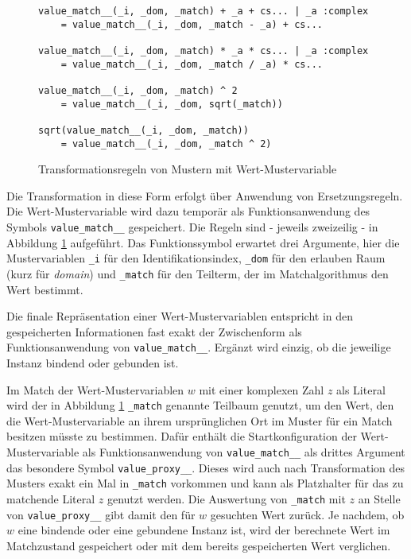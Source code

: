 \begin{figure}
\begin{verbatim}
value_match__(_i, _dom, _match) + _a + cs... | _a :complex 
    = value_match__(_i, _dom, _match - _a) + cs...
        
value_match__(_i, _dom, _match) * _a * cs... | _a :complex 
    = value_match__(_i, _dom, _match / _a) * cs...
        
value_match__(_i, _dom, _match) ^ 2                        
    = value_match__(_i, _dom, sqrt(_match))
        
sqrt(value_match__(_i, _dom, _match))                           
    = value_match__(_i, _dom, _match ^ 2)
\end{verbatim}
\label{figWertMusterBau}
\caption{Transformationsregeln von Mustern mit Wert-Mustervariable}
\end{figure}

Die Transformation in diese Form erfolgt über Anwendung von Ersetzungsregeln. Die Wert-Mustervariable wird dazu temporär als Funktionsanwendung des Symbols \verb|value_match__| gespeichert. Die Regeln sind - jeweils zweizeilig -  in Abbildung \ref{figWertMusterBau} aufgeführt. Das Funktionssymbol erwartet drei Argumente, hier die Mustervariablen \verb|_i| für den Identifikationsindex, \verb|_dom| für den erlauben Raum (kurz für \emph{domain}) und \verb|_match| für den Teilterm, der im Matchalgorithmus den Wert bestimmt. 


Die finale Repräsentation einer Wert-Mustervariablen entspricht in den gespeicherten Informationen fast exakt der Zwischenform als Funktionsanwendung von \verb|value_match__|. Ergänzt wird einzig, ob die jeweilige Instanz bindend oder gebunden ist.

Im Match der Wert-Mustervariablen $w$ mit einer komplexen Zahl $z$ als Literal wird der in Abbildung \ref{figWertMusterBau} \verb|_match| genannte Teilbaum genutzt, um den Wert, den die Wert-Mustervariable an ihrem ursprünglichen Ort im Muster für ein Match besitzen müsste zu bestimmen. Dafür enthält die Startkonfiguration der Wert-Mustervariable als Funktionsanwendung von \verb|value_match__| als drittes Argument das besondere Symbol \verb|value_proxy__|. Dieses wird auch nach Transformation des Musters exakt ein Mal in \verb|_match| vorkommen und kann als Platzhalter für das zu matchende Literal $z$ genutzt werden. Die Auswertung von \verb|_match| mit $z$ an Stelle von \verb|value_proxy__| gibt damit den für $w$ gesuchten Wert zurück. Je nachdem, ob $w$ eine bindende oder eine gebundene Instanz ist, wird der berechnete Wert im Matchzustand  gespeichert oder mit dem bereits gespeicherten Wert verglichen.


